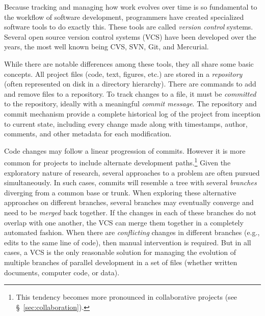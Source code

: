 \documentclass[11pt,oneside,english]{article}
\begin{document}
Because tracking and managing how work evolves over time is so fundamental to
the workflow of software development, programmers have created specialized
software tools to do exactly this. These tools are called \emph{version
  control} systems. Several open source version control systems (VCS) have been
developed over the years, the most well known being CVS, SVN, Git, and
Mercurial.

While there are notable differences among these tools, they all share some
basic concepts.  All project files (code, text, figures, etc.) are stored in a
\emph{repository} (often represented on disk in a directory hierarchy).  There
are commands to add and remove files to a repository.  To track changes to a
file, it must be \emph{committed} to the repository, ideally with a meaningful
\emph{commit message}.  The repository and commit mechanism provide a complete
historical log of the project from inception to current state, including every
change made along with timestamps, author, comments, and other metadata for each
modification.

Code changes may follow a linear progression of commits.  However it is more
common for projects to include alternate development paths.\footnote{This
tendency becomes more pronounced in collaborative projects (see
§~\ref{sec:collaboration}).} Given the exploratory nature of research, several
approaches to a problem are often pursued simultaneously. In such cases,
commits will resemble a tree with several \emph{branches} diverging from a
common base or trunk. When exploring these alternative approaches on different
branches, several branches may eventually converge and need to be \emph{merged}
back together.  If the changes in each of these branches do not overlap with
one another, the VCS can merge them together in a completely automated fashion.
When there are \emph{conflicting} changes in different branches (e.g., edits to
the same line of code), then manual intervention is required.  But in all
cases, a VCS is the only reasonable solution for managing the evolution of
multiple branches of parallel development in a set of files (whether written
documents, computer code, or data).
\end{document}
